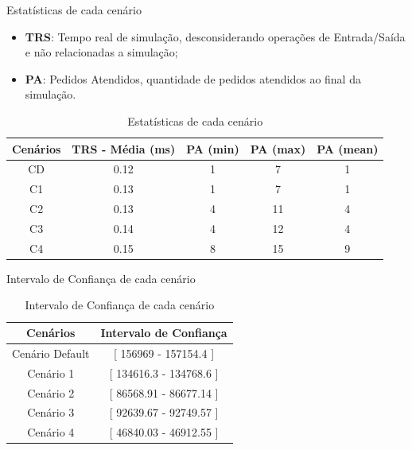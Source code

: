 \documentclass[xcolor=dvipsnames]{beamer}
\let\olditem=\item%
\renewcommand{\item}{\olditem \justifying}%
\begin{document}
\begin{frame}{Estatísticas de cada cenário}
	\begin{itemize}
		\item \textbf{TRS}: Tempo real de simulação, desconsiderando operações de Entrada/Saída e não relacionadas a simulação;
        \medskip
		\item \textbf{PA}: Pedidos Atendidos, quantidade de pedidos atendidos ao final da simulação.
	\end{itemize}
	\begin{table}[H]
		\centering
		\begin{tabular}{|c|c|c|c|c|}
			\hline
			\textbf{Cenários} & \textbf{TRS - Média (ms)} & \textbf{PA (min)} & \textbf{PA (max)} & \textbf{PA (mean)} \\ \hline
			CD                 & 0.12                       & 1                 & 7                 & 1                  \\ \hline
			C1                 & 0.13                       & 1                 & 7                 & 1                  \\ \hline
			C2                 & 0.13                       & 4                 & 11                & 4                  \\ \hline
			C3                 & 0.14                       & 4                 & 12                & 4                  \\ \hline
			C4                 & 0.15                       & 8                 & 15                & 9                  \\ \hline
		\end{tabular}
		\caption {Estatísticas de cada cenário}
	\end{table}
\end{frame}
	
\begin{frame}{Intervalo de Confiança de cada cenário}
	\begin{table}[H]
		\centering
		\begin{tabular}{|c|c|}
			\hline
			\textbf{Cenários} & \textbf{Intervalo de Confiança} \\ \hline
			Cenário Default   & [ 156969 - 157154.4 ]            \\ \hline
			Cenário 1         & [ 134616.3 - 134768.6 ]          \\ \hline
			Cenário 2         & [ 86568.91 - 86677.14 ]          \\ \hline
			Cenário 3         & [ 92639.67 - 92749.57 ]          \\ \hline
			Cenário 4         & [ 46840.03 - 46912.55 ]          \\ \hline
		\end{tabular}
		\caption {Intervalo de Confiança de cada cenário}
	\end{table}
\end{frame}
	
\end{document}
